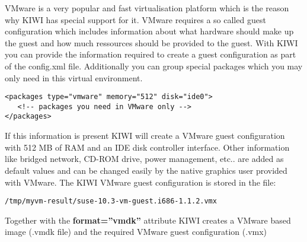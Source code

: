 VMware is a very popular and fast virtualisation platform which is
the reason why KIWI has special support for it. VMware requires a
so called guest configuration which includes information about what
hardware should make up the guest and how much ressources should be
provided to the guest. With KIWI you can provide the information
required to create a guest configuration as part of the config.xml
file. Additionally you can group special packages which you may only
need in this virtual environment.

\begin{Command}{13cm}
\begin{verbatim}
<packages type="vmware" memory="512" disk="ide0">
   <!-- packages you need in VMware only -->
</packages>
\end{verbatim}
\end{Command}

If this information is present KIWI will create a VMware guest
configuration with 512 MB of RAM and an IDE disk controller interface.
Other information like bridged network, CD-ROM drive, power management, etc..
are added as default values and can be changed easily by the native
graphics user provided with VMware. The KIWI VMware guest configuration
is stored in the file:

\begin{Command}{13cm}
\begin{verbatim}
/tmp/myvm-result/suse-10.3-vm-guest.i686-1.1.2.vmx
\end{verbatim}
\end{Command}

Together with the \textbf{format=''vmdk''} attribute KIWI creates
a VMware based image (.vmdk file) and the required VMware guest
configuration (.vmx)
